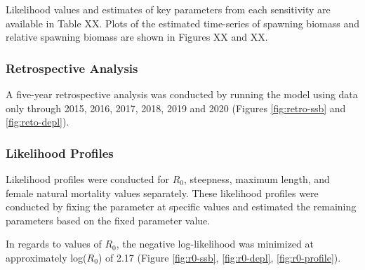 \documentclass[11pt,
  english,
  a4paper,
]{article}
\begin{document}
Likelihood values and estimates of key parameters from each sensitivity are available in Table XX. Plots of the estimated time-series of spawning biomass and relative spawning biomass are shown in Figures XX and XX.

\leavevmode\tagmcend\tagstructend\par


\hypertarget{retrospective-analysis}{%
\subsubsection{Retrospective Analysis}\label{retrospective-analysis}}

\leavevmode\tagmcend\tagstructend


A five-year retrospective analysis was conducted by running the model using data only through 2015, 2016, 2017, 2018, 2019 and 2020 (Figures \ref{fig:retro-ssb} and \ref{fig:reto-depl}).

\leavevmode\tagmcend\tagstructend\par


\hypertarget{likelihood-profiles}{%
\subsubsection{Likelihood Profiles}\label{likelihood-profiles}}

\leavevmode\tagmcend\tagstructend


Likelihood profiles were conducted for {\(R_0\)\leavevmode\tagmcend\tagstructend}, steepness, maximum length, and female natural mortality values separately. These likelihood profiles were conducted by fixing the parameter at specific values and estimated the remaining parameters based on the fixed parameter value.

\leavevmode\tagmcend\tagstructend\par


In regards to values of {\(R_0\)\leavevmode\tagmcend\tagstructend}, the negative log-likelihood was minimized at approximately log({\(R_0\)\leavevmode\tagmcend\tagstructend}) of 2.17 (Figure \ref{fig:r0-ssb}, \ref{fig:r0-depl}, \ref{fig:r0-profile}).
\end{document}
